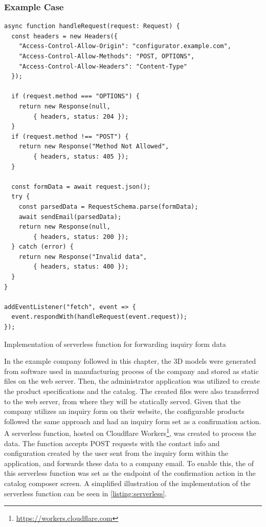 \subsubsection{Example Case}

\begin{listing}[h!]
\begin{verbatim}
async function handleRequest(request: Request) {
  const headers = new Headers({
    "Access-Control-Allow-Origin": "configurator.example.com",
    "Access-Control-Allow-Methods": "POST, OPTIONS",
    "Access-Control-Allow-Headers": "Content-Type"
  });

  if (request.method === "OPTIONS") {
    return new Response(null,
        { headers, status: 204 });
  }
  if (request.method !== "POST") {
    return new Response("Method Not Allowed",
        { headers, status: 405 });
  }

  const formData = await request.json();
  try {
    const parsedData = RequestSchema.parse(formData);
    await sendEmail(parsedData);
    return new Response(null, 
        { headers, status: 200 });
  } catch (error) {
    return new Response("Invalid data",
        { headers, status: 400 });
  }
}

addEventListener("fetch", event => {
  event.respondWith(handleRequest(event.request));
});
\end{verbatim}
\caption{Implementation of serverless function for forwarding inquiry form data}
\label{listing:serverless}
\end{listing}

In the example company followed in this chapter, the 3D models were generated from  software used in manufacturing process of the company and stored as static files on the web server. Then, the administrator application was utilized to create the product specifications and the catalog. The created files were also transferred to the web server, from where they will be statically served. Given that the company utilizes an inquiry form on their website, the configurable products followed the same approach and had an inquiry form set as a confirmation action. A serverless function, hosted on Cloudflare Workers\footnote{\url{https://workers.cloudflare.com}}, was created to process the data. The function accepts POST requests with the contact info and configuration created by the user sent from the inquiry form within the application, and forwards these data to a company email. To enable this, the  of this serverless function was set as the endpoint of the confirmation action in the catalog composer screen. A simplified illustration of the implementation of the serverless function can be seen in \autoref{listing:serverless}.


